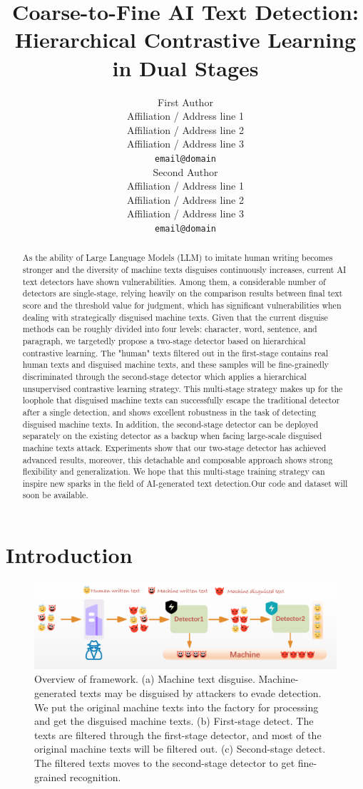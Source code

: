 \documentclass[11pt]{article}
\title{Coarse-to-Fine AI Text Detection: Hierarchical Contrastive Learning in Dual Stages}
\author{First Author \\
	Affiliation / Address line 1 \\
	Affiliation / Address line 2 \\
	Affiliation / Address line 3 \\
	\texttt{email@domain} \\\And
	Second Author \\
	Affiliation / Address line 1 \\
	Affiliation / Address line 2 \\
	Affiliation / Address line 3 \\
	\texttt{email@domain} \\}
\begin{document}
	\maketitle
	\begin{abstract}
		As the ability of Large Language Models (LLM) to imitate human writing becomes stronger and the diversity of machine texts disguises continuously increases, current AI text detectors have shown vulnerabilities. Among them, a considerable number of detectors are single-stage, relying heavily on the comparison results between final text score and the threshold value for judgment, which has significant vulnerabilities when dealing with strategically disguised machine texts. Given that the current disguise methods can be roughly divided into four levels: character, word, sentence, and paragraph, we targetedly propose a two-stage detector based on hierarchical contrastive learning. The "human" texts filtered out in the first-stage contains real human texts and disguised machine texts, and these samples will be fine-grainedly discriminated through the second-stage detector which applies a hierarchical unsupervised contrastive learning strategy. This multi-stage strategy makes up for the loophole that disguised machine texts can successfully escape the traditional detector after a single detection, and shows excellent robustness in the task of detecting disguised machine texts. In addition, the second-stage detector can be deployed separately on the existing detector as a backup when facing large-scale disguised machine texts attack. Experiments show that our two-stage detector has achieved advanced results, moreover, this detachable and composable approach shows strong flexibility and generalization. We hope that this multi-stage training strategy can inspire new sparks in the field of AI-generated text detection.Our code and dataset will soon be available.
	\end{abstract}
	

	
	\section{Introduction}
	\begin{figure}
    \centering
    \includegraphics[width=1.0\linewidth]{pics/frame.png}
    \caption{Overview of framework. (a) Machine text disguise. Machine-generated texts may be disguised by attackers to evade detection. We put the original machine texts into the factory for processing and get the disguised machine texts. (b) First-stage detect. The texts are filtered through the first-stage detector, and most of the original machine texts will be filtered out. (c) Second-stage detect. The filtered texts moves to the second-stage detector to get fine-grained recognition.}
\label{fig:method}
\end{figure}
\end{document}
